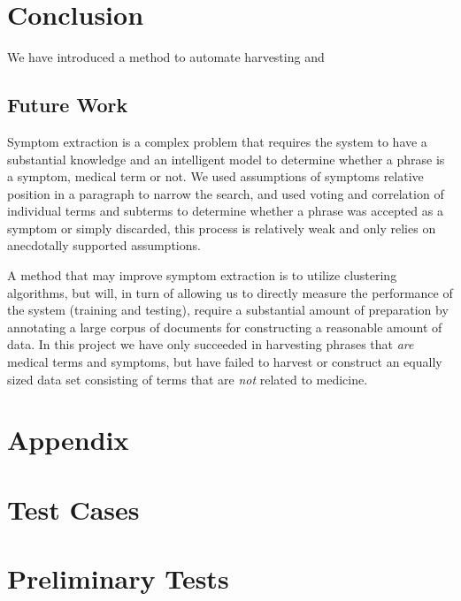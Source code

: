 \documentclass[10pt,letterpaper,final]{article}
\begin{document}
\section{Conclusion}
We have introduced a method to automate harvesting and 


\subsection{Future Work}
Symptom extraction is a complex problem that requires the system to have
a substantial knowledge and an intelligent model to determine whether a
phrase is a symptom, medical term or not. We used assumptions of
symptoms relative position in a paragraph to narrow the search, and used
voting and correlation of individual terms and subterms to determine
whether a phrase was accepted as a symptom or simply discarded, this
process is relatively weak and only relies on anecdotally supported
assumptions.

A method that may improve symptom extraction is to utilize clustering
algorithms, but will, in turn of allowing us to directly measure the
performance of the system (training and testing), require a substantial
amount of preparation by annotating a large corpus of documents for
constructing a reasonable amount of data. In this project we have only
succeeded in harvesting phrases that \textit{are} medical terms and
symptoms, but have failed to harvest or construct an equally sized data
set consisting of terms that are \textit{not} related to medicine.


\renewcommand\bibname{References}



\appendix
\section{Appendix}
\label{app:orphanet}

\section{Test Cases}

\section{Preliminary Tests}
\label{app:preliminary_results}
\end{document}

